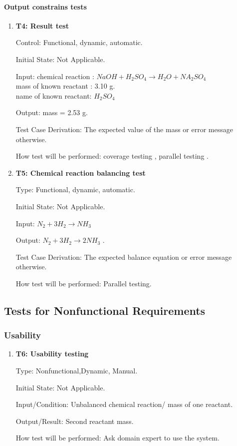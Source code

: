 \documentclass[12pt, titlepage]{article}
\begin{document}
\paragraph{Output constrains tests}

\begin{enumerate}

\item{\bf T4: Result test\\}

Control:  Functional, dynamic, automatic.
					
Initial State: Not Applicable.
					
Input: chemical reaction : $NaOH + H_2SO_4 \rightarrow H_2O + NA_2SO_4$\\
mass of known reactant : 3.10 g.\\
name  of known reactant: $H_2SO_4$
				
Output: mass = 2.53 g.

Test Case Derivation: The expected value of the mass  or error message otherwise.
					
How test will be performed: coverage testing , parallel testing .

\item{\bf T5: Chemical reaction balancing test\\}

Type: Functional, dynamic, automatic.
					
Initial State: Not Applicable.
					
Input: $ N_2 + 3H_2 \rightarrow NH_3 $ 
					
Output: $ N_2 + 3H_2 \rightarrow 2NH_3 $ .

Test Case Derivation: The expected balance equation or error message otherwise.

How test will be performed: Parallel testing.

\end{enumerate}

\subsection{Tests for Nonfunctional Requirements}


\subsubsection{Usability}
		

\begin{enumerate}

\item{\bf T6: Usability testing\\}

Type: Nonfunctional,Dynamic, Manual.
					
Initial State:  Not Applicable.
					
Input/Condition:  Unbalanced chemical reaction/ mass of one reactant.
					
Output/Result:  Second reactant mass.
					
How test will be performed: Ask domain expert to use the system.
					

\end{enumerate}
\end{document}
